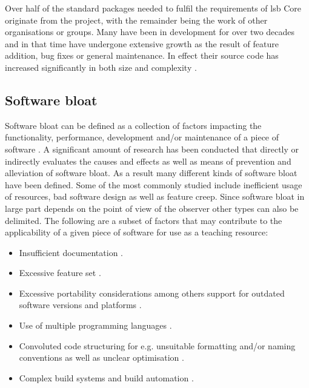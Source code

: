 Over half of the standard packages needed to fulfil the requirements of \gls{lsb} Core originate from the  project, with the remainder being the work of other organisations or groups. Many have been in development for over two decades and in that time have undergone extensive growth as the result of feature addition, bug fixes or general maintenance. In effect their source code has increased significantly in both size and complexity \cite{Succi2001PreliminaryRF,Quach2018DebloatingST,Quach2019BloatFA}.

\subsection{Software bloat}

Software bloat can be defined as a collection of factors impacting the functionality, performance, development and/or maintenance of a piece of software \cite{McGrenere2000AreWA,McGrenere2000BloatTO,Quach2018DebloatingST,Quach2019BloatFA}. A significant amount of research has been conducted that directly or indirectly evaluates the causes \cite{Mitchell2010FourTL} and effects \cite{Quach2019BloatFA} as well as means of prevention \cite{Pike2007ProgramDI,Milicchio2007TheUK} and alleviation \cite{Quach2018DebloatingST} of software bloat. As a result many different kinds of software bloat have been defined. Some of the most commonly studied include inefficient usage of resources, bad software design as well as feature creep. Since software bloat in large part depends on the point of view of the observer other types can also be delimited. The following are a subset of factors that may contribute to the applicability of a given piece of software for use as a teaching resource:

\begin{itemize}
    \item Insufficient documentation \cite{doc-issues,doc-quality}.
    \item Excessive feature set \cite{lean-plea,lean-software,reduction}.
    \item Excessive portability considerations among others support for outdated software versions and platforms \cite{autohell,four-lang}.
    \item Use of multiple programming languages \cite{multi-lang}.
    \item Convoluted code structuring for e.g. unsuitable formatting and/or naming conventions as well as unclear optimisation \cite{convention-violations,variable-naming}.
    \item Complex build systems and build automation \cite{recursive,non-recursive,tool-usage}.
\end{itemize}

